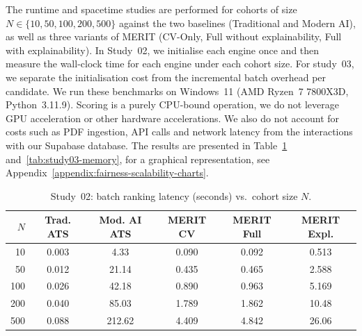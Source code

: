 The runtime and spacetime studies are performed for cohorts of size $N \in \{10, 50, 100, 200, 500\}$ against the two baselines (Traditional and Modern AI),
as well as three variants of MERIT (CV-Only, Full without explainability, Full with explainability). In Study~02, we initialise each
engine once and then measure the wall-clock time for each engine under each cohort size. For study~03, we separate the initialisation 
cost from the incremental batch overhead per candidate. We run these benchmarks on Windows~11 (AMD Ryzen~7 7800X3D, Python~3.11.9).
Scoring is a purely CPU-bound operation, we do not leverage GPU acceleration or other hardware accelerations. We also do not
account for costs such as PDF ingestion, API calls and network latency from the interactions with our Supabase database.
The results are presented in Table~\ref{tab:runtime-results} and~\ref{tab:study03-memory}, 
for a graphical representation, see Appendix~\ref{appendix:fairness-scalability-charts}.

\begin{table}[htbp]
    \centering
    \caption[Study~02: Batch ranking latency]{Study~02: batch ranking latency (seconds) vs.\ cohort size $N$.}
    \label{tab:runtime-results}
    \vspace{1.5ex}
    \small
    \setlength{\tabcolsep}{6pt}
    \begin{tabular}{r c c c c c}
        \toprule
        \textbf{$N$} & \textbf{Trad. ATS} & \textbf{Mod. AI ATS} & \textbf{MERIT CV} & \textbf{MERIT Full} & \textbf{MERIT Expl.} \\ \midrule
        10  & 0.003  & 4.33   & 0.090 & 0.092 & 0.513 \\
        50  & 0.012  & 21.14  & 0.435 & 0.465 & 2.588 \\
        100 & 0.026  & 42.18  & 0.890 & 0.963 & 5.169 \\
        200 & 0.040  & 85.03  & 1.789 & 1.862 & 10.48 \\
        500 & 0.088  & 212.62 & 4.409 & 4.842 & 26.06 \\ \bottomrule
    \end{tabular}
\end{table}

